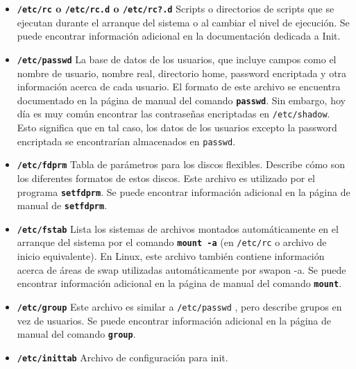 \documentclass[12pt]{article}
\begin{document}
\begin{itemize} 

\item \textbf{\texttt{/etc/rc} o
\texttt{/etc/rc.d} o \texttt{/etc/rc?.d}}
 Scripts o directorios de scripts que se ejecutan durante el
arranque del sistema o  al cambiar el nivel de ejecución. Se puede
encontrar información adicional en la documentación dedicada a Init.


\item \textbf{\texttt{/etc/passwd}}
 La base de datos de los usuarios, que incluye campos como el
nombre de usuario, nombre real, directorio home, password encriptada y otra
información acerca de cada usuario.  El formato de este archivo se encuentra
documentado en la página de manual del comando \texttt{\textbf{passwd}}. 
	 Sin embargo, hoy día es muy común encontrar las contraseñas encriptadas
	 en \texttt{/etc/shadow}. Esto significa que en tal caso,
	 los 	 	 datos de los usuarios excepto la password encriptada se
	 encontrarían 	 		 almacenados en
	 \texttt{passwd}.  

	\item \textbf{\texttt{/etc/fdprm}}
	 Tabla de parámetros para los discos flexibles.  Describe
	cómo son los diferentes formatos de estos discos.  Este archivo es
	utilizado por el programa \texttt{\textbf{setfdprm}}.  Se puede
	encontrar información adicional en la página de manual de
	\texttt{\textbf{setfdprm}}.  

	\item \textbf{\texttt{/etc/fstab}}
	 Lista los sistemas de archivos montados automáticamente
	en 		el arranque del sistema por el comando \texttt{\textbf{mount
	-a}} (en \texttt{/etc/rc} o archivo de inicio
	equivalente). En 			Linux, este archivo también
	contiene información acerca de áreas de swap 		utilizadas
	automáticamente por swapon -a. Se puede encontrar información
	adicional en 
la página de manual del
	comando \texttt{\textbf{mount}}.  

	
	\item \textbf{\texttt{/etc/group}}
	 Este archivo es similar a
	\texttt{/etc/passwd} , pero describe grupos en vez de
	usuarios. Se puede encontrar información 		adicional en la
	página de manual del comando \texttt{\textbf{group}}.
	


	\item \textbf{\texttt{/etc/inittab}}
	 Archivo de configuración para init.
	



\end{itemize}
\end{document}
